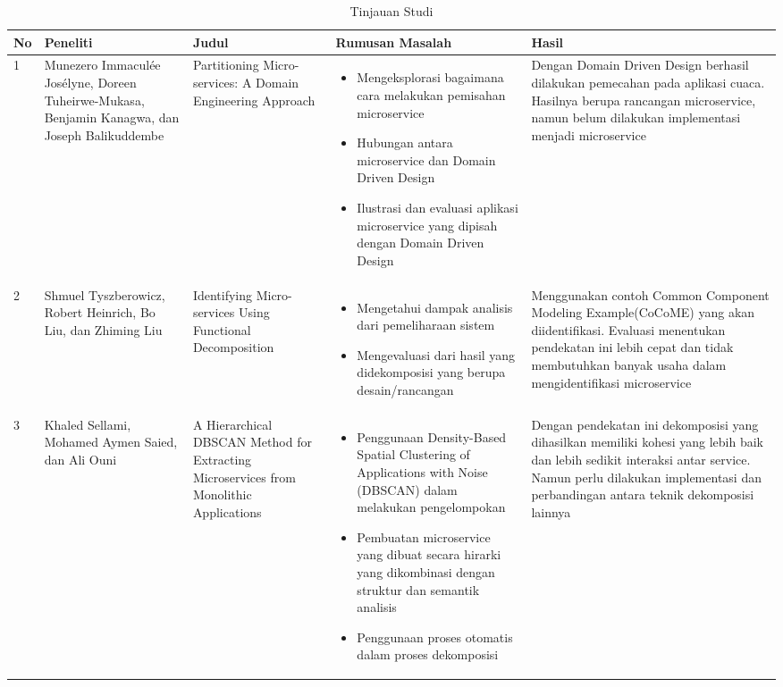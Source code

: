 \begingroup
\setlength{\LTleft}{-20cm plus -1fill}
\setlength{\LTright}{\LTleft}
\begin{small}
	\begin{longtable}{|p{0.5cm}|p{2.7cm}|p{2.5cm}|p{3.8cm}|p{2.5cm}|}
		\caption{Tinjauan Studi}\\
		\hline
		\textbf{No} & \textbf{Peneliti} & \textbf{Judul} & \textbf{Rumusan Masalah} & \textbf{Hasil}\\
		\endfirsthead
		
		\hline
		1 & Munezero Immaculée Josélyne, Doreen Tuheirwe-Mukasa, Benjamin Kanagwa, dan Joseph Balikuddembe 
		  & Partitioning Micro-services: A Domain Engineering Approach  \cite{7}
		  & \begin{itemize}
				\item Mengeksplorasi bagaimana cara melakukan pemisahan microservice 
				\item Hubungan antara microservice dan Domain Driven Design
				\item Ilustrasi dan evaluasi aplikasi microservice yang dipisah dengan Domain Driven Design
		  	\end{itemize}
		  & Dengan Domain Driven Design berhasil dilakukan pemecahan pada aplikasi cuaca. Hasilnya berupa rancangan microservice, namun belum dilakukan implementasi menjadi microservice\\
		
		\hline
		2 & Shmuel Tyszberowicz,  Robert Heinrich, Bo Liu, dan Zhiming Liu 
		& Identifying Micro-services Using Functional Decomposition  \cite{8}
		& \begin{itemize}
				\item Mengetahui dampak analisis dari pemeliharaan sistem
				\item Mengevaluasi dari hasil yang didekomposisi yang berupa desain/rancangan
			\end{itemize}
		& Menggunakan contoh Common Component Modeling Example(CoCoME) yang akan diidentifikasi. Evaluasi menentukan pendekatan ini lebih cepat  dan tidak membutuhkan banyak usaha dalam mengidentifikasi microservice\\

		\hline
		3 & Khaled Sellami, Mohamed Aymen Saied, dan Ali Ouni 
			& A Hierarchical DBSCAN Method for Extracting Microservices from Monolithic Applications  \cite{9}
			& \begin{itemize}
				\item Penggunaan Density-Based Spatial Clustering of Applications with Noise (DBSCAN) dalam melakukan pengelompokan
				\item Pembuatan microservice yang dibuat secara hirarki yang dikombinasi dengan struktur dan semantik analisis
				\item Penggunaan proses otomatis dalam proses dekomposisi
			  \end{itemize}
			& Dengan pendekatan ini dekomposisi yang dihasilkan memiliki kohesi yang lebih baik dan lebih sedikit interaksi antar service. Namun perlu dilakukan implementasi dan perbandingan antara teknik dekomposisi lainnya\\
		

\end{longtable}
\end{small}
